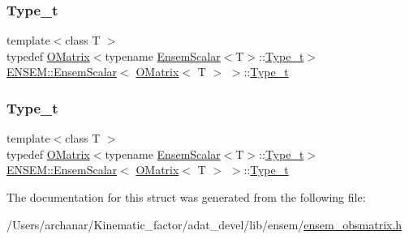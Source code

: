 \subsubsection{\texorpdfstring{Type\_t}{Type\_t}\hspace{0.1cm}{\footnotesize\ttfamily [1/2]}}
{\footnotesize\ttfamily template$<$class T $>$ \\
typedef \mbox{\hyperlink{classENSEM_1_1OMatrix}{O\+Matrix}}$<$typename \mbox{\hyperlink{structENSEM_1_1EnsemScalar}{Ensem\+Scalar}}$<$T$>$\+::\mbox{\hyperlink{structENSEM_1_1EnsemScalar_3_01OMatrix_3_01T_01_4_01_4_ae82c62e546f488affe11e2bd214d3279}{Type\+\_\+t}}$>$ \mbox{\hyperlink{structENSEM_1_1EnsemScalar}{E\+N\+S\+E\+M\+::\+Ensem\+Scalar}}$<$ \mbox{\hyperlink{classENSEM_1_1OMatrix}{O\+Matrix}}$<$ T $>$ $>$\+::\mbox{\hyperlink{structENSEM_1_1EnsemScalar_3_01OMatrix_3_01T_01_4_01_4_ae82c62e546f488affe11e2bd214d3279}{Type\+\_\+t}}}

\mbox{\label{structENSEM_1_1EnsemScalar_3_01OMatrix_3_01T_01_4_01_4_ae82c62e546f488affe11e2bd214d3279}} 
\subsubsection{\texorpdfstring{Type\_t}{Type\_t}\hspace{0.1cm}{\footnotesize\ttfamily [2/2]}}
{\footnotesize\ttfamily template$<$class T $>$ \\
typedef \mbox{\hyperlink{classENSEM_1_1OMatrix}{O\+Matrix}}$<$typename \mbox{\hyperlink{structENSEM_1_1EnsemScalar}{Ensem\+Scalar}}$<$T$>$\+::\mbox{\hyperlink{structENSEM_1_1EnsemScalar_3_01OMatrix_3_01T_01_4_01_4_ae82c62e546f488affe11e2bd214d3279}{Type\+\_\+t}}$>$ \mbox{\hyperlink{structENSEM_1_1EnsemScalar}{E\+N\+S\+E\+M\+::\+Ensem\+Scalar}}$<$ \mbox{\hyperlink{classENSEM_1_1OMatrix}{O\+Matrix}}$<$ T $>$ $>$\+::\mbox{\hyperlink{structENSEM_1_1EnsemScalar_3_01OMatrix_3_01T_01_4_01_4_ae82c62e546f488affe11e2bd214d3279}{Type\+\_\+t}}}



The documentation for this struct was generated from the following file\+:\begin{DoxyCompactItemize}
\item 
/\+Users/archanar/\+Kinematic\+\_\+factor/adat\+\_\+devel/lib/ensem/\mbox{\hyperlink{lib_2ensem_2ensem__obsmatrix_8h}{ensem\+\_\+obsmatrix.\+h}}\end{DoxyCompactItemize}
